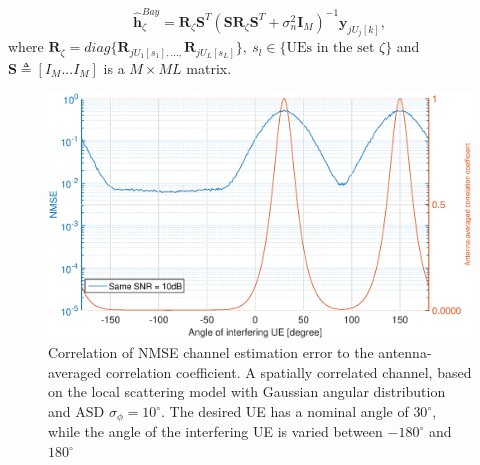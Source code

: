 \begin{equation}
\hat{\mathbf{h}}_{\zeta}^{Bay}=\mathbf{R}_{\zeta}\mathbf{S}^{T}(\mathbf{S}\mathbf{R}_{\zeta}\mathbf{S}^{T}+\sigma_{n}^{2}\mathbf{I}_{M})^{-1}\mathbf{y}_{jU_{j}[k]},
\end{equation}
where $\mathbf{R}_{\zeta}=diag\{\mathbf{R}_{jU_{1}[s_{1}],...,}\mathbf{R}_{jU_{L}[s_{L}]}\},\:s_{l}\in \{\text{UEs in the set } \zeta\}$ and $\mathbf{S}\triangleq[I_{M}...I_{M}]$ is a $M\times ML$ matrix.


\begin{figure}[t!]
	\centering
	\includegraphics[width=1.0\linewidth]{figures/NMSE_correlation.eps}
	\caption{Correlation of NMSE channel estimation error to the antenna-averaged correlation coefficient. A spatially correlated channel, based on
the local scattering model with Gaussian angular distribution and ASD $ \sigma_\phi= 10^\circ$. The desired UE has a nominal angle of $30^\circ$, while the angle of the interfering UE
is varied between $−180^\circ$ and $180^\circ$}
	\label{fig:channel_correlation_model}
\end{figure}



